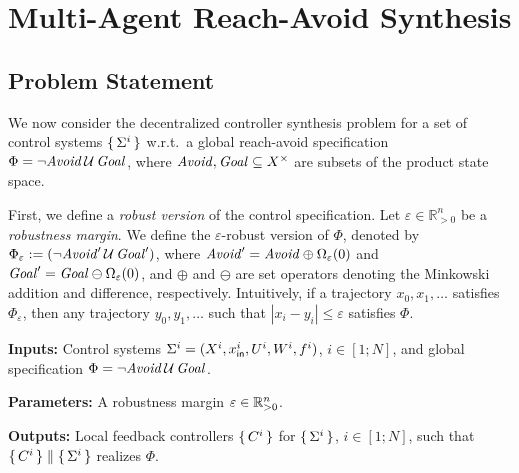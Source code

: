 
\section{Multi-Agent Reach-Avoid Synthesis}
\label{sec:problem}

\subsection{Problem Statement}

We now consider the decentralized controller synthesis problem for a set of control systems 
$\set{\Sigma^i}$ w.r.t.\ a global reach-avoid specification $\Phi = \lnot\mathit{Avoid}\, \mathcal{U}\,\mathit{Goal}$,
where $\mathit{Avoid}, \mathit{Goal} \subseteq X^\times$ are subsets of the product state space. 

% 

First, we define a \emph{robust version} of the control specification.
Let $\varepsilon\in \mathbb{R}^n_{>0}$ be a \emph{robustness margin}. 
We define the $\varepsilon$-robust version of $\Phi$, denoted by $\Phi_\varepsilon:=(\lnot\mathit{Avoid}'\,\mathcal{U}\,\mathit{Goal}')$,
where $\mathit{Avoid}'=\mathit{Avoid}\oplus\Omega_\varepsilon(0)$ and 
$\mathit{Goal}'=\mathit{Goal}\ominus\Omega_\varepsilon(0)$, and $\oplus$ and $\ominus$ are set operators denoting the Minkowski addition and difference, respectively. 
Intuitively, if a trajectory $x_0,x_1,\ldots$ satisfies $\Phi_\varepsilon$, then any trajectory $y_0, y_1,\ldots$ such that
$|x_i - y_i | \leq \varepsilon$ satisfies $\Phi$.


\begin{resp}
\begin{problem}
\label{problem}
\noindent\textbf{Inputs:} Control systems $\Sigma^i=(X^i,x_{\mathsf{in}}^i,U^i,W^i,f^i)$, $i\in [1;N]$, and global specification $\Phi=\lnot\mathit{Avoid}\,\mathcal{U}\,\mathit{Goal}$.

\noindent\textbf{Parameters:} A robustness margin $\varepsilon\in \mathbb{R}^n_{>0}$.

\noindent\textbf{Outputs:} Local feedback controllers $\set{C^i}$ for $\set{\Sigma^i}$, $i\in [1;N]$, such that $\set{C^i}\parallel \set{\Sigma^i}$ realizes $\Phi$. 
\end{problem}
\end{resp}

